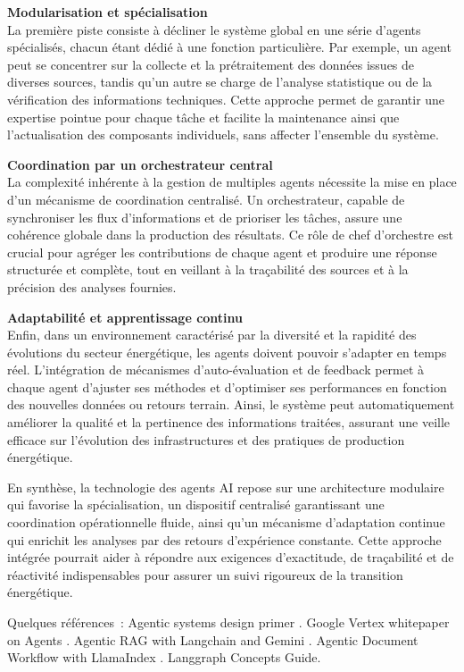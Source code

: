 \documentclass[a4paper,11pt]{report}
\begin{document}
\textbf{Modularisation et spécialisation}\\
La première piste consiste à décliner le système global en une série d'agents spécialisés, chacun étant dédié à une fonction particulière. Par exemple, un agent peut se concentrer sur la collecte et la prétraitement des données issues de diverses sources, tandis qu'un autre se charge de l'analyse statistique ou de la vérification des informations techniques. Cette approche permet de garantir une expertise pointue pour chaque tâche et facilite la maintenance ainsi que l'actualisation des composants individuels, sans affecter l'ensemble du système.

\textbf{Coordination par un orchestrateur central}\\
La complexité inhérente à la gestion de multiples agents nécessite la mise en place d'un mécanisme de coordination centralisé. Un orchestrateur, capable de synchroniser les flux d'informations et de prioriser les tâches, assure une cohérence globale dans la production des résultats. Ce rôle de chef d'orchestre est crucial pour agréger les contributions de chaque agent et produire une réponse structurée et complète, tout en veillant à la traçabilité des sources et à la précision des analyses fournies.

\textbf{Adaptabilité et apprentissage continu}\\
Enfin, dans un environnement caractérisé par la diversité et la rapidité des évolutions du secteur énergétique, les agents doivent pouvoir s'adapter en temps réel. L'intégration de mécanismes d'auto-évaluation et de feedback permet à chaque agent d'ajuster ses méthodes et d'optimiser ses performances en fonction des nouvelles données ou retours terrain. Ainsi, le système peut automatiquement améliorer la qualité et la pertinence des informations traitées, assurant une veille efficace sur l'évolution des infrastructures et des pratiques de production énergétique.

En synthèse, la technologie des agents AI repose sur une architecture modulaire qui favorise la spécialisation, un dispositif centralisé garantissant une coordination opérationnelle fluide, ainsi qu'un mécanisme d'adaptation continue qui enrichit les analyses par des retours d'expérience constante. Cette approche intégrée pourrait aider à répondre aux exigences d'exactitude, de traçabilité et de réactivité indispensables pour assurer un suivi rigoureux de la transition énergétique.

Quelques références~: Agentic systems design primer \citep{W45HUZN5}. Google Vertex whitepaper on Agents \citep{MW2ME5P3}. Agentic RAG with Langchain and Gemini \citep{ZF27JTIS}. Agentic Document Workflow with LlamaIndex \citep{CVBHDNL3}. \citep{LKNBDMMK} Langgraph Concepts Guide.
\end{document}
